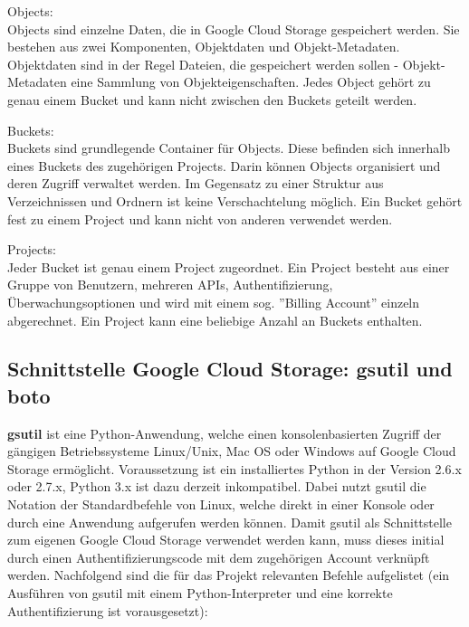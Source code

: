 \documentclass[12pt,a4paper,bibliography=totocnumbered,listof=totocnumbered]{scrartcl}
\begin{document}
\begin{compactitem}
	\item Objects:\\
	Objects sind einzelne Daten, die in Google Cloud Storage gespeichert werden. Sie bestehen aus zwei Komponenten, Objektdaten und Objekt-Metadaten. Objektdaten sind in der Regel Dateien, die gespeichert werden sollen - Objekt-Metadaten eine Sammlung von Objekteigenschaften. Jedes Object gehört zu genau einem Bucket und kann nicht zwischen den Buckets geteilt werden. 
		\item Buckets:\\
	Buckets sind grundlegende Container für Objects. Diese befinden sich innerhalb eines Buckets des zugehörigen Projects. Darin können Objects organisiert und deren Zugriff verwaltet werden. Im Gegensatz zu einer Struktur aus Verzeichnissen und Ordnern ist keine Verschachtelung möglich. Ein Bucket gehört fest zu einem Project und kann nicht von anderen verwendet werden.
	\item Projects:\\
 Jeder Bucket ist genau einem Project zugeordnet. Ein Project besteht aus einer Gruppe von Benutzern, mehreren APIs, Authentifizierung, Überwachungsoptionen und wird mit einem sog. ''Billing Account'' einzeln abgerechnet. Ein Project kann eine beliebige Anzahl an Buckets enthalten.
\end{compactitem}

\subsection{Schnittstelle Google Cloud Storage: gsutil und boto}\label{GsutilV}
\textbf{gsutil} \cite{32} ist eine Python-Anwendung, welche einen konsolenbasierten Zugriff der gängigen Betriebssysteme Linux/Unix, Mac OS oder Windows auf Google Cloud Storage ermöglicht. Voraussetzung ist ein installiertes Python in der Version 2.6.x oder 2.7.x,  Python 3.x ist dazu derzeit inkompatibel. Dabei nutzt gsutil die Notation der Standardbefehle von Linux, welche direkt in einer Konsole oder durch eine Anwendung aufgerufen werden können. Damit gsutil als Schnittstelle zum eigenen Google Cloud Storage verwendet werden kann, muss dieses initial durch einen Authentifizierungscode mit dem zugehörigen Account verknüpft werden. Nachfolgend sind die für das Projekt relevanten Befehle aufgelistet (ein Ausführen von gsutil mit einem Python-Interpreter und eine korrekte Authentifizierung ist vorausgesetzt):
\end{document}
